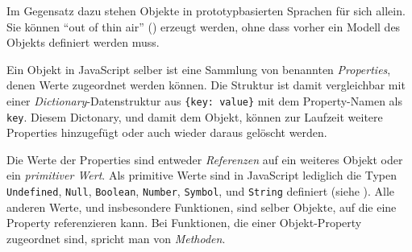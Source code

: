 

Im Gegensatz dazu stehen Objekte in prototypbasierten Sprachen für sich allein. Sie können "`out of thin air"' (\citep[p. 21]{SimpsonThisobjectprototypes2014}) erzeugt werden, ohne dass vorher ein Modell des Objekts definiert werden muss. 


Ein Objekt in JavaScript selber ist eine Sammlung von benannten \emph{Properties}, denen Werte zugeordnet werden können. Die Struktur ist damit vergleichbar mit einer \emph{Dictionary}-Datenstruktur aus \texttt{\{key: value\}} mit dem Property-Namen als \texttt{key}. Diesem Dictonary, und damit dem Objekt, können zur Laufzeit weitere Properties hinzugefügt oder auch wieder daraus gelöscht werden.

Die Werte der Properties sind entweder \emph{Referenzen} auf ein weiteres Objekt oder ein \emph{primitiver Wert}. Als primitive Werte sind in JavaScript lediglich die Typen \texttt{Undefined}, \texttt{Null}, \texttt{Boolean}, \texttt{Number}, \texttt{Symbol}, und \texttt{String} definiert (siehe \citep[§4.3.2]{international2018ecmascript}). Alle anderen Werte, und insbesondere Funktionen, sind selber Objekte, auf die eine Property referenzieren kann. Bei Funktionen, die einer Objekt-Property zugeordnet sind, spricht man von \emph{Methoden}.



